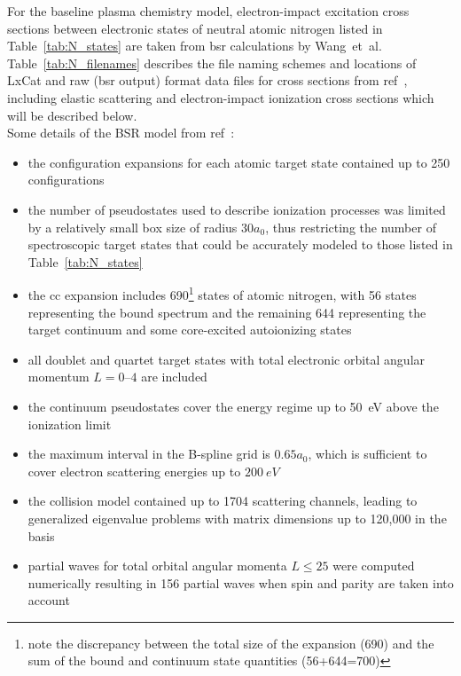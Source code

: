 \documentclass[12pt]{article}
\begin{document}
For the baseline plasma chemistry model, electron-impact excitation
cross sections between electronic 
states of neutral
atomic nitrogen listed in Table~\ref{tab:N_states} are taken from \ac{bsr}
calculations by Wang~et~al.\cite{wang2014} 
Table~\ref{tab:N_filenames} describes the file naming schemes and locations of LxCat and raw (\ac{bsr} output)
format data files for cross sections from ref~\cite{wang2014}, including elastic scattering and electron-impact 
ionization cross sections which will be described below. \\

Some details of the BSR model from ref~\cite{wang2014}:
\begin{itemize}
		\item the configuration expansions for each atomic target state
				contained up to 250 configurations
		\item the number of pseudostates used to describe ionization processes
				was limited by a relatively small box size of radius $30 a_0$, thus 
				restricting the number of spectroscopic target states that could be
				accurately modeled to those listed in Table~\ref{tab:N_states}
		\item the \ac{cc} expansion includes 690\footnote{note the discrepancy
				between the total size of the expansion (690) and the sum of the bound and continuum
				state quantities (56+644=700)} states of atomic
				nitrogen, with 56 states representing the bound spectrum
				and the remaining 644 representing the target continuum
				and some core-excited autoionizing states
		\item all doublet and quartet target states with total electronic orbital
				angular momentum $L = 0–4$ are included
		\item the continuum pseudostates cover the energy regime up to 50~eV
				above the ionization limit
		\item the maximum interval in the B-spline grid is $0.65 a_0$, which is
				sufficient to cover electron scattering energies up to $200~eV$
		\item the collision model contained up to 1704 scattering channels, leading to generalized eigenvalue
				problems with matrix dimensions up to 120,000 in the \bspline{} basis 
		\item partial waves for total orbital angular momenta $L\le25$ were computed numerically
				resulting in 156 partial waves when spin and parity are taken into account
\end{itemize}
\end{document}
